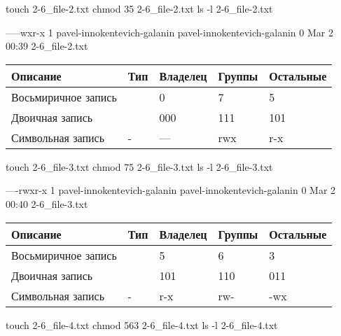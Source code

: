 \begin{BashBox}
    touch 2-6_file-2.txt
    chmod 35 2-6_file-2.txt
    ls -l 2-6_file-2.txt
\end{BashBox}

\begin{OutBox}
    -----wxr-x 1 pavel-innokentevich-galanin pavel-innokentevich-galanin 0 Mar  2 00:39 2-6_file-2.txt
\end{OutBox}

\begin{table}[h!]
    \centering
    \begin{tabular}{ | l | l | l | l | l | }
        \hline
        Описание            & Тип   & Владелец  & Группы    & Остальные \\ \hline
        \hline
        Восьмиричное запись & 	    & 0	        & 7 	    & 5         \\ \hline
        Двоичная запись     & 	    & 000 	    & 111 	    & 101       \\ \hline
        Символьная запись 	& -     & --- 	    & rwx 	    & r-x       \\ \hline
    \end{tabular}
\end{table}

\begin{BashBox}
    touch 2-6_file-3.txt
    chmod 75 2-6_file-3.txt
    ls -l 2-6_file-3.txt
\end{BashBox}

\begin{OutBox}
    ----rwxr-x 1 pavel-innokentevich-galanin pavel-innokentevich-galanin 0 Mar  2 00:40 2-6_file-3.txt
\end{OutBox}

\begin{table}[h!]
    \centering
    \begin{tabular}{ | l | l | l | l | l | }
        \hline
        Описание            & Тип   & Владелец  & Группы    & Остальные \\ \hline
        \hline
        Восьмиричное запись & 	    & 5	        & 6 	    & 3         \\ \hline
        Двоичная запись     & 	    & 101 	    & 110 	    & 011       \\ \hline
        Символьная запись 	& -     & r-x 	    & rw- 	    & -wx       \\ \hline
    \end{tabular}
\end{table}

\begin{BashBox}
    touch 2-6_file-4.txt
    chmod 563 2-6_file-4.txt
    ls -l 2-6_file-4.txt
\end{BashBox}

